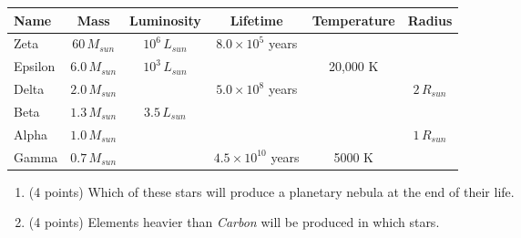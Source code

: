 \documentclass[12pt]{article}
\begin{document}
\begin{enumerate}
\begin{tabular}{|l|c|c|c|c|c|}\hline
Name & Mass & Luminosity & Lifetime & Temperature & Radius\\\hline
Zeta & $60\, M_{sun}$   &  $10^6 \,L_{sun}$ & $8.0\times 10^5$ years &  & \\\hline
Epsilon & $6.0\, M_{sun}$ & $10^3 \,L_{sun}$  &   & 20,000 K & \\\hline
Delta & $2.0\, M_{sun}$  &  & $5.0\times 10^8$ years &  & $2\, R_{sun}$ \\\hline
Beta & $1.3\, M_{sun}$ & $3.5\, L_{sun}$ &  &  &  \\\hline
Alpha & $1.0\, M_{sun}$ &   &   &   & $1\, R_{sun}$   \\\hline
Gamma & $0.7\, M_{sun}$ &  &  $4.5\times 10^{10}$ years & 5000 K  &  \\\hline
\end{tabular}\vskip 0.2in

\begin{enumerate}     %
\item (4 points) Which of these stars will produce a planetary nebula at the end of their life.
\vskip0.3in
\item (4 points) Elements heavier than \textit{Carbon} will be produced in which stars.                                 
\end{enumerate}        %
\end{enumerate}        %
\end{document}
